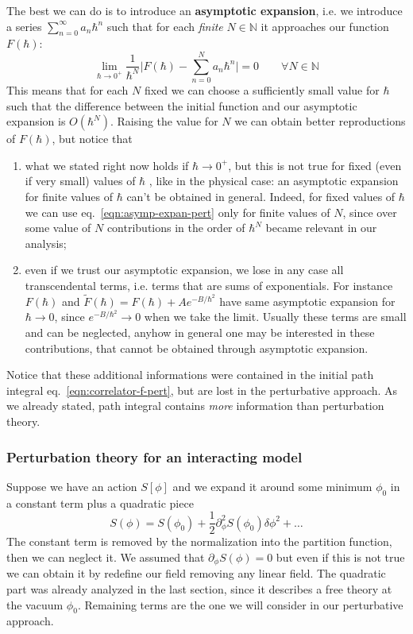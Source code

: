 \documentclass[../main/main.tex]{subfiles}
\begin{document}
The best we can do is to introduce an \textbf{asymptotic expansion}, i.e. we introduce a series $\sum_{n=0}^\infty a_n\hbar^n$ such that for each \emph{finite} $N\in\mathbb N$ it approaches our function $F(\hbar)$:
\begin{equation}\label{eqn:asymp-expan-pert}
\lim_{\hbar\to0^+}\frac1{\hbar^N}\Bigg\vert F(\hbar)-\sum_{n=0}^Na_n\hbar^n\Bigg\vert=0
\qquad\forall N\in\mathbb N
\end{equation}
This means that for each $N$ fixed we can choose a sufficiently small value for $\hbar$ such that the difference between the initial function and our asymptotic expansion is $O(\hbar^N)$. Raising the value for $N$ we can obtain better reproductions of $F(\hbar)$, but notice that 
\begin{enumerate}[label=\textbullet]
\item what we stated right now holds if $\hbar\to0^+$, but this is not true  for fixed (even if very small) values of $\hbar$ , like in the physical case: an asymptotic expansion for finite values of $\hbar$ can't be obtained in general. Indeed, for fixed values of $\hbar$ we can use eq.~\eqref{eqn:asymp-expan-pert} only for finite values of $N$, since over some value of $N$ contributions in the order of $\hbar^N$ became relevant in our analysis;
\item even if we trust our asymptotic expansion, we lose in any case all transcendental terms, i.e. terms that are sums of exponentials. For instance $F(\hbar)$ and $\widetilde F(\hbar)=F(\hbar)+Ae^{-B/\hbar^2}$ have same asymptotic expansion for $\hbar\to0$, since $e^{-B/\hbar^2}\to0$ when we take the limit. Usually these terms are small and can be neglected, anyhow in general one may be interested in these contributions, that cannot be obtained through asymptotic expansion. 
\end{enumerate}
Notice that these additional informations were contained in the initial path integral eq.~\eqref{eqn:correlator-f-pert}, but are lost in the perturbative approach. As we already stated, path integral contains \emph{more} information than perturbation theory. 

\subsubsection{Perturbation theory for an interacting model}

Suppose we have an action $S[\phi]$ and we expand it around some minimum $\phi_0$  in a constant term plus a quadratic piece
\[S(\phi)=S(\phi_0)+\frac12\partial_\phi^2S(\phi_0)\delta\phi^2+\dots\]
The constant term is removed by the normalization into the partition function, then we can neglect it. We assumed that $\partial_\phi S(\phi)=0$ but even if this is not true we can obtain it by redefine our field removing any linear field. The quadratic part was already analyzed in the last section, since it describes a free theory at the vacuum $\phi_0$. Remaining terms are the one we will consider in our perturbative approach. 
\end{document}
